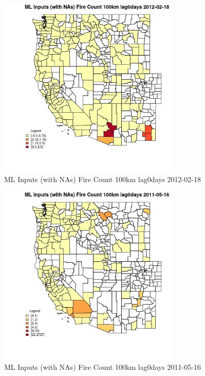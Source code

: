 \begin{figure} 
\centering  
\includegraphics[width=0.77\textwidth]{Code_Outputs/Report_ML_input_PM25_Step4_part_f_de_duplicated_aves_prioritize_24hr_obswNAs_CountyFire_Count_100km_lag0daysMean2012-02-18.jpg} 
\caption{\label{fig:Report_ML_input_PM25_Step4_part_f_de_duplicated_aves_prioritize_24hr_obswNAsCountyFire_Count_100km_lag0daysMean2012-02-18}ML Inputs (with NAs) Fire Count 100km lag0days 2012-02-18} 
\end{figure} 
 

\begin{figure} 
\centering  
\includegraphics[width=0.77\textwidth]{Code_Outputs/Report_ML_input_PM25_Step4_part_f_de_duplicated_aves_prioritize_24hr_obswNAs_CountyFire_Count_100km_lag0daysMean2011-05-16.jpg} 
\caption{\label{fig:Report_ML_input_PM25_Step4_part_f_de_duplicated_aves_prioritize_24hr_obswNAsCountyFire_Count_100km_lag0daysMean2011-05-16}ML Inputs (with NAs) Fire Count 100km lag0days 2011-05-16} 
\end{figure} 
 

